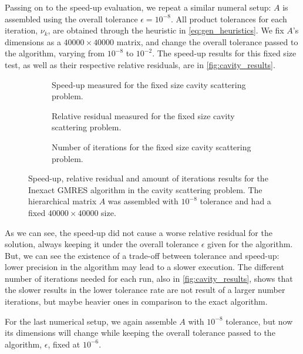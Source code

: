 Passing on to the speed-up evaluation, we repeat a similar numeral setup: $A$ is assembled using the overall tolerance $\epsilon = 10^{-8}$. All product tolerances for each iteration, $\nu_{k}$, are obtained through the heuristic in \ref{eq:gen_heuristics}. We fix $A$'s dimensions as a $40000\times 40000$ matrix, and change the overall tolerance passed to the algorithm, varying from $10^{-8}$ to $10^{-2}$. The speed-up results for this fixed size test, as well as their respective relative residuals, are in \autoref{fig:cavity_results}.

\begin{figure}[h!]
    \centering
    \begin{subfigure}[b]{0.6\linewidth}
        
        \caption{Speed-up measured for the fixed size cavity scattering problem.}
    \end{subfigure}
    \begin{subfigure}[b]{0.4\linewidth}
        
        \caption{Relative residual measured for the fixed size cavity scattering problem.}
    \end{subfigure}
    \begin{subfigure}[b]{0.4\linewidth}
        
        \caption{Number of iterations for the fixed size cavity scattering problem.}
    \end{subfigure}
    \caption{Speed-up, relative residual and amount of iterations results for the Inexact GMRES algorithm in the cavity scattering problem. The hierarchical matrix $A$ was assembled with $10^{-8}$ tolerance and had a fixed $40000 \times 40000$ size.}
    \label{fig:cavity_results}
\end{figure}

As we can see, the speed-up did not cause a worse relative residual for the solution, always keeping it under the overall tolerance $\epsilon$ given for the algorithm. But, we can see the existence of a trade-off between tolerance and speed-up: lower precision in the algorithm may lead to a slower execution. The different number of iterations needed for each run, also in \autoref{fig:cavity_results}, shows that the slower results in the lower tolerance rate are not result of a larger number iterations, but maybe heavier ones in comparison to the exact algorithm.

For the last numerical setup, we again assemble $A$ with $10^{-8}$ tolerance, but now its dimensions will change while keeping the overall tolerance passed to the algorithm, $\epsilon$, fixed at $10^{-6}$.

